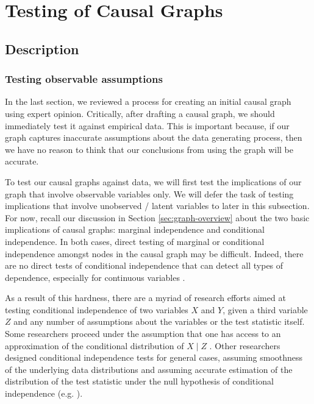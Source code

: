 \section{Testing of Causal Graphs}
\label{sec:graph-testing}

\subsection{Description}
\label{sec:testing-description}

\subsubsection{Testing observable assumptions}
\label{sec:observable-tests}
In the last section, we reviewed a process for creating an initial causal graph using expert opinion.
Critically, after drafting a causal graph, we should immediately test it against empirical data.
This is important because, if our graph captures inaccurate assumptions about the data generating process, then we have no reason to think that our conclusions from using the graph will be accurate.

To test our causal graphs against data, we will first test the implications of our graph that involve observable variables only.
We will defer the task of testing implications that involve unobserved / latent variables to later in this subsection.
For now, recall our discussion in Section \ref{sec:graph-overview} about the two basic implications of causal graphs: marginal independence and conditional independence.
In both cases, direct testing of marginal or conditional independence amongst nodes in the causal graph may be difficult.
Indeed, there are no direct tests of conditional independence that can detect all types of dependence, especially for continuous variables \citep{bergsma_2004_testing, shah_2020_hardness}.

As a result of this hardness, there are a myriad of research efforts aimed at testing conditional independence of two variables $X$ and $Y$, given a third variable $Z$ and any number of assumptions about the variables or the test statistic itself.
Some researchers proceed under the assumption that one has access to an approximation of the conditional distribution of $X \mid Z$ \citep{candes_2018_panning, berrett_2019_conditional}.
Other researchers designed conditional independence tests for general cases, assuming smoothness of the underlying data distributions and assuming accurate estimation of the distribution of the test statistic under the null hypothesis of conditional independence (e.g. \citet{zhang_2012_kernel, strobl_2019_approximate}).

